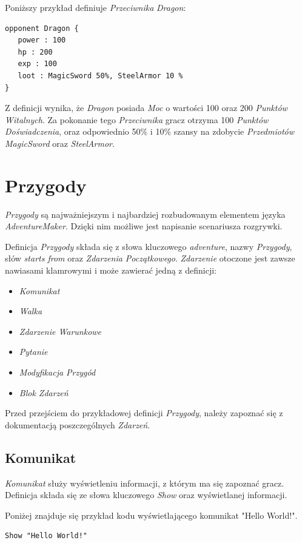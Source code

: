 \documentclass[openright]{xmgr}
\begin{document}
Poniższy przykład definiuje \textit{Przeciwnika} \textit{Dragon}:

\begin{verbatim}
opponent Dragon {
   power : 100
   hp : 200
   exp : 100
   loot : MagicSword 50%, SteelArmor 10 %
}
\end{verbatim}

Z definicji wynika, że \textit{Dragon} posiada \textit{Moc} o wartości 100 oraz 200 \textit{Punktów Witalnych}. Za pokonanie tego \textit{Przeciwnika} gracz otrzyma 100 \textit{Punktów Doświadczenia}, oraz odpowiednio 50\% i 10\% szansy na zdobycie \textit{Przedmiotów} \textit{MagicSword} oraz \textit{SteelArmor}.

\section{Przygody}
\textit{Przygody} są najważniejszym i najbardziej rozbudowanym elementem języka \textit{AdventureMaker}. Dzięki nim możliwe jest napisanie scenariusza rozgrywki. 

Definicja \textit{Przygody} składa się z słowa kluczowego \textit{adventure}, nazwy \textit{Przygody}, słów \textit{starts from} oraz \textit{Zdarzenia Początkowego}. \textit{Zdarzenie} otoczone jest zawsze nawiasami klamrowymi i może zawierać jedną z definicji:
\begin{itemize}
	\item \textit{Komunikat}
	\item \textit{Walka}
	\item \textit{Zdarzenie Warunkowe}
	\item \textit{Pytanie}
	\item \textit{Modyfikacja Przygód}
	\item \textit{Blok Zdarzeń}
\end{itemize}

Przed przejściem do przykładowej definicji \textit{Przygody}, należy zapoznać się z dokumentacją poszczególnych \textit{Zdarzeń}.
\subsection*{Komunikat}
\textit{Komunikat} służy wyświetleniu informacji, z którym ma się zapoznać gracz. Definicja składa się ze słowa kluczowego \textit{Show} oraz wyświetlanej informacji.

Poniżej znajduje się przykład kodu wyświetlającego komunikat "Hello World!".
\begin{verbatim}
Show "Hello World!"
\end{verbatim}
\end{document}
